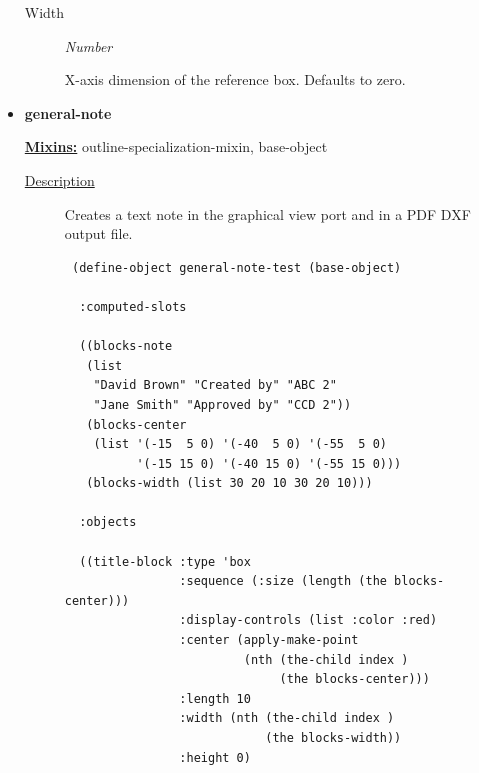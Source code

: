 \documentclass [11pt]{book}
\begin{document}
\begin{itemize}
\begin{description}
\item [Width]
\emph{Number}

 X-axis dimension of the reference box. Defaults to zero.




\end{description}







\item {}
\label{prim:general-note}
\textbf{general-note}


\textbf{
\underline{Mixins:}} outline-specialization-mixin, base-object





\begin{description}

\item [
\underline{Description}]


Creates a text note in the graphical view port and in a PDF DXF output file.



\end{description}




\begin{figure}
\begin{lrbox}{\boxedverb}
\begin{minipage}{\linewidth}
{\small

\begin{verbatim} 
 (define-object general-note-test (base-object)
  
  :computed-slots
  
  ((blocks-note 
   (list
    "David Brown" "Created by" "ABC 2"
    "Jane Smith" "Approved by" "CCD 2"))
   (blocks-center 
    (list '(-15  5 0) '(-40  5 0) '(-55  5 0)
          '(-15 15 0) '(-40 15 0) '(-55 15 0)))
   (blocks-width (list 30 20 10 30 20 10)))
  
  :objects 
  
  ((title-block :type 'box
                :sequence (:size (length (the blocks-center)))
                :display-controls (list :color :red)
                :center (apply-make-point 
                         (nth (the-child index ) 
                              (the blocks-center)))
                :length 10
                :width (nth (the-child index ) 
                            (the blocks-width))
                :height 0)


\end{verbatim}}
\end{minipage}
\end{lrbox}
\end{figure}
\end{itemize}
\end{document}

